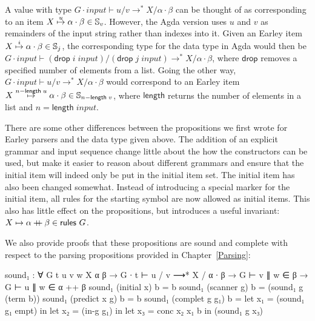 \newcommand{\tdrop}{\mathsf{drop}}
\newcommand{\tlength}{\mathsf{length}}
\newcommand{\vinput}{\mathit{input}}
\newcommand{\rslash}{\mathrel{{}/{}}}


		A value with type $G \cdot \vinput \vdash u \rslash v \rightarrow^* X
		\rslash \alpha \cdot \beta$ can be thought of as corresponding to an
		item $X\overset{u}{\mapsto}\alpha\cdot\beta \in \mathbb{S}_{v}$. However, the Agda
		version uses $u$ and $v$ as remainders of the input string rather than
		indexes into it.  Given an Earley item {$X\overset{i}{\mapsto}\alpha\cdot\beta
		\in \mathbb{S}_{j}$, the corresponding type for the data type in Agda would then
		be $G \cdot \vinput \vdash (\tdrop\;i\;\vinput) \rslash
		(\tdrop\;j\;\vinput) \rightarrow^* X \rslash \alpha \cdot \beta$, where
		$\tdrop$ removes a specified number of elements from a list. Going the
		other way, $G \cdot \vinput \vdash u \rslash v \rightarrow^* X \rslash
		\alpha \cdot \beta$ would correspond to an Earley item
		$\earley{X}{\alpha}{\beta}{n - \tlength\;u} \in \St{n - \tlength\;v}$},
		where $\tlength$ returns the number of elements in a list and $n =
		\tlength\;\vinput$.

		There are some other differences between the propositions we first
		wrote for Earley parsers and the data type given above. The addition of
		an explicit grammar and input sequence change little about the how the
		constructors can be used, but make it easier to reason about different
		grammars and ensure that the initial item will indeed only be put in
		the initial item set. The initial item has also been changed somewhat.
		Instead of introducing a special marker for the initial item, all rules
		for the starting symbol are now allowed as initial items.  This also
		has little effect on the propositions, but introduces a useful
		invariant: $X \mapsto \alpha \mathbin{{+}\mspace{-8mu}{+}} \beta \in \textsf{rules } G$.

		We also provide proofs that these propositions are sound and complete
		with respect to the parsing propositions provided in
		Chapter~\ref{Parsing}:

		\begin{code}
			sound₁ : ∀ {G t u v w X α β} →
			  G ∙ t ⊢ u / v ⟶* X / α ∙ β →
			    G ⊢ v ∥ w ∈ β →
			    G ⊢ u ∥ w ∈ α ++ β
			sound₁ (initial x)     b = b
			sound₁ (scanner g)     b = (sound₁ g (term b))
			sound₁ (predict x g)   b = b
			sound₁ (complet g g₁)  b =
			  let x₁ = (sound₁ g₁ empt) in
			  let x₂ = (in-g g₁) in
			  let x₃ = conc x₂ x₁ b in
			  (sound₁ g x₃)
		\end{code}

